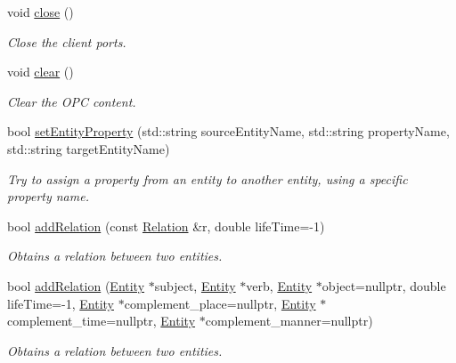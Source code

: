 \begin{DoxyCompactItemize}
void \hyperlink{group__icubclient__clients_a4b193fe61992f927591ea0e5ff2a6f66}{close} ()
\begin{DoxyCompactList}\small\item\em Close the client ports. \end{DoxyCompactList}\item 
void \hyperlink{group__icubclient__clients_ae884577090108846f1b0015818a2f13d}{clear} ()
\begin{DoxyCompactList}\small\item\em Clear the O\+PC content. \end{DoxyCompactList}\item 
bool \hyperlink{group__icubclient__clients_a384897adb9f2d8d19e6c6ff6a9e5c946}{set\+Entity\+Property} (std\+::string source\+Entity\+Name, std\+::string property\+Name, std\+::string target\+Entity\+Name)
\begin{DoxyCompactList}\small\item\em Try to assign a property from an entity to another entity, using a specific property name. \end{DoxyCompactList}\item 
bool \hyperlink{group__icubclient__clients_a08ede3e77a372824e3a176a1d6466638}{add\+Relation} (const \hyperlink{group__icubclient__representations_classicubclient_1_1Relation}{Relation} \&r, double life\+Time=-\/1)
\begin{DoxyCompactList}\small\item\em Obtains a relation between two entities. \end{DoxyCompactList}\item 
bool \hyperlink{group__icubclient__clients_ab0ef7754465e8fdd7b199d47e10f3d54}{add\+Relation} (\hyperlink{group__icubclient__representations_classicubclient_1_1Entity}{Entity} $\ast$subject, \hyperlink{group__icubclient__representations_classicubclient_1_1Entity}{Entity} $\ast$verb, \hyperlink{group__icubclient__representations_classicubclient_1_1Entity}{Entity} $\ast$object=nullptr, double life\+Time=-\/1, \hyperlink{group__icubclient__representations_classicubclient_1_1Entity}{Entity} $\ast$complement\+\_\+place=nullptr, \hyperlink{group__icubclient__representations_classicubclient_1_1Entity}{Entity} $\ast$complement\+\_\+time=nullptr, \hyperlink{group__icubclient__representations_classicubclient_1_1Entity}{Entity} $\ast$complement\+\_\+manner=nullptr)
\begin{DoxyCompactList}\small\item\em Obtains a relation between two entities. \end{DoxyCompactList}\item 

\end{DoxyCompactItemize}
